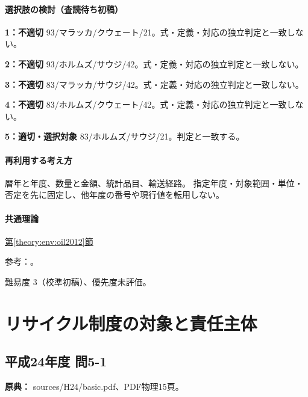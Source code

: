 \paragraph{選択肢の検討（査読待ち初稿）}\mbox{}\par

\noindent\textbf{1：不適切} 93/マラッカ/クウェート/21。式・定義・対応の独立判定と一致しない。\par

\noindent\textbf{2：不適切} 93/ホルムズ/サウジ/42。式・定義・対応の独立判定と一致しない。\par

\noindent\textbf{3：不適切} 83/マラッカ/サウジ/42。式・定義・対応の独立判定と一致しない。\par

\noindent\textbf{4：不適切} 83/ホルムズ/クウェート/42。式・定義・対応の独立判定と一致しない。\par

\noindent\textbf{5：適切・選択対象} 83/ホルムズ/サウジ/21。判定と一致する。\par

\paragraph{再利用する考え方} 暦年と年度、数量と金額、統計品目、輸送経路。 指定年度・対象範囲・単位・否定を先に固定し、他年度の番号や現行値を転用しない。

\paragraph{共通理論} \hyperref[theory:env:oil2012]{第\ref*{theory:env:oil2012}節}

\par 参考：\cite{env58_oil}。

\par 難易度 3（校準初稿）、優先度未評価。

\section{リサイクル制度の対象と責任主体}

\subsection{平成24年度 問5-1}
\label{q:h24-reg-basic-5-1}

\noindent\textbf{原典：} sources/H24/basic.pdf、PDF物理15頁。

